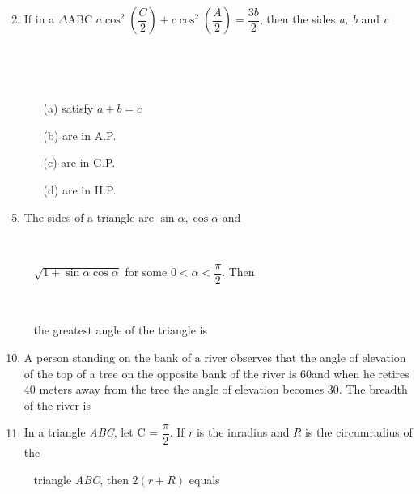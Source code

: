 \documentclass[journal,12pt,twocolumn]{IEEEtran}
\begin{document}
\begin{enumerate}
\begin{itemize}
\begin{multicols}{2}
 \end{multicols}
 \end{itemize}
 \item If in a $\Delta$ABC $a \cos^2\left(\dfrac{C}{2}\right)+c \cos^2\left(\dfrac{A}{2}\right)=\dfrac{3b}{2}$, then the sides \textsl{a, b} and \textsl{c} \item[~] \item[~]
 \begin{itemize}
 \item[(a)] satisfy $a+b = c$ \item[(b)] are in A.P. \item[(c)] are in G.P. \item[(d)] are in H.P.
 \end{itemize}
 \item The sides of a triangle are $\sin\alpha, \cos\alpha$ and\item[~]\item[~] $\sqrt{1+\sin\alpha \cos\alpha}$ for some $0<\alpha<\dfrac{\pi}{2}$. Then \item[~]\item[~]the greatest angle of the triangle is
 \begin{itemize}
 \end{itemize}
 \item A person standing on the bank of a river observes that the angle of elevation of the top of a tree on the opposite bank of the river is 60\degree and when he retires 40 meters away from the tree the angle of elevation becomes 30\degree. The breadth of the river is
 \begin{itemize}
 \end{itemize}
 \item In a triangle \textsl{ABC}, let \angle C = $\dfrac{\pi}{2}$. If \textsl{r} is the inradius and \textsl{R} is the circumradius of the \item[~]triangle \textsl{ABC}, then $2\left(r+R\right)$ equals

\end{enumerate}
\end{document}
